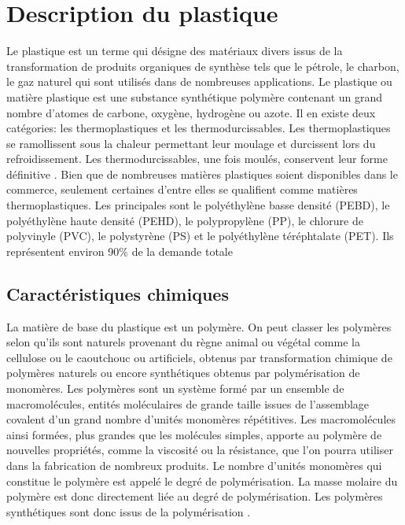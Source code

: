 \section{Description du plastique}
\par{
Le plastique est un terme qui d\'esigne des mat\'eriaux divers issus de la transformation de produits organiques de synth\`ese tels que le p\'etrole, le charbon, le gaz naturel qui sont utilis\'es dans de nombreuses applications. Le plastique ou mati\`ere plastique est une substance synth\'etique polym\`ere contenant un grand nombre d'atomes de carbone, oxyg\`ene, hydrog\`ene ou azote. Il en existe deux cat\'egories: les thermoplastiques et les thermodurcissables. Les thermoplastiques se ramollissent sous la chaleur permettant leur moulage et durcissent lors du refroidissement. Les thermodurcissables, une fois moul\'es, conservent leur forme d\'efinitive {\citep{Valorplast}}. Bien que de nombreuses mati\`eres plastiques soient disponibles dans le commerce, seulement certaines d'entre elles se qualifient comme mati\`eres thermoplastiques. Les principales sont le poly\'ethyl\`ene basse densit\'e (PEBD), le poly\'ethyl\`ene haute densit\'e (PEHD), le polypropyl\`ene (PP), le chlorure de polyvinyle (PVC), le polystyr\`ene (PS) et le poly\'ethyl\`ene t\'er\'ephtalate (PET). Ils repr\'esentent environ 90\% de la demande totale {\citep{andrady2009applications}}
}

\subsection{Caract\'eristiques chimiques}
\par{
La mati\`ere de base du plastique est un polym\`ere. On peut classer les polym\`eres selon qu'ils sont naturels provenant du r\`egne animal ou v\'eg\'etal comme la cellulose ou le caoutchouc ou artificiels, obtenus par transformation chimique de polym\`eres naturels ou encore synth\'etiques obtenus par polym\'erisation de monom\`eres. Les polym\`eres sont un  syst\`eme form\'e par un ensemble de macromol\'ecules, entit\'es mol\'eculaires de grande taille issues de l'assemblage covalent d'un grand nombre d'unit\'es monom\`eres r\'ep\'etitives. Les macromol\'ecules ainsi form\'ees, plus grandes que les mol\'ecules simples, apporte au polym\`ere de nouvelles propri\'et\'es, comme la viscosit\'e ou la r\'esistance, que l'on pourra utiliser dans la fabrication de nombreux produits. Le nombre d'unit\'es monom\`eres qui constitue le polym\`ere est appel\'e le degr\'e de polym\'erisation. La masse molaire du polym\`ere est donc directement li\'ee au degr\'e de polym\'erisation. Les polym\`eres synth\'etiques sont donc issus de la polym\'erisation {\citep{fontanille2014chimie}}.
}


